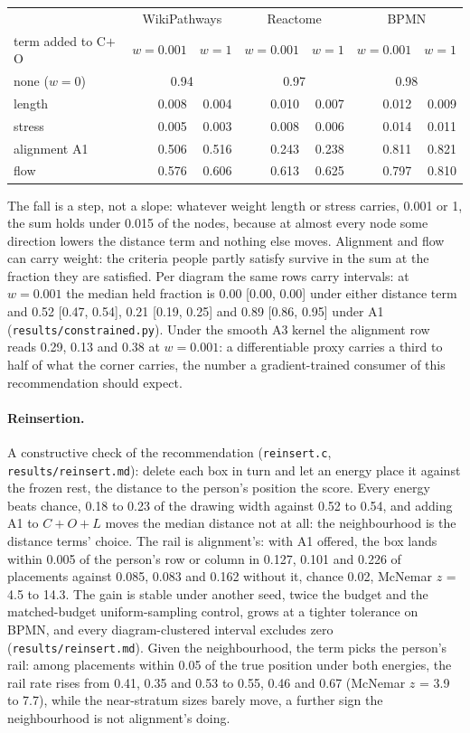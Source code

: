 \documentclass[11pt]{article}
\begin{document}
\begin{center}\small
\begin{tabular}{lrrrrrr}
\toprule
 & \multicolumn{2}{c}{WikiPathways} & \multicolumn{2}{c}{Reactome} & \multicolumn{2}{c}{BPMN} \\
term added to C$+$O & $w{=}0.001$ & $w{=}1$ & $w{=}0.001$ & $w{=}1$ & $w{=}0.001$ & $w{=}1$ \\
\midrule
none ($w = 0$) & \multicolumn{2}{c}{0.94} & \multicolumn{2}{c}{0.97} & \multicolumn{2}{c}{0.98} \\
length & 0.008 & 0.004 & 0.010 & 0.007 & 0.012 & 0.009 \\
stress & 0.005 & 0.003 & 0.008 & 0.006 & 0.014 & 0.011 \\
alignment A1 & 0.506 & 0.516 & 0.243 & 0.238 & 0.811 & 0.821 \\
flow & 0.576 & 0.606 & 0.613 & 0.625 & 0.797 & 0.810 \\
\bottomrule
\end{tabular}
\end{center}

The fall is a step, not a slope: whatever weight length or stress carries, 0.001 or 1, the
sum holds under 0.015 of the nodes, because at almost every node some direction lowers the
distance term and nothing else moves. Alignment and flow can carry weight: the criteria
people partly satisfy survive in the sum at the fraction they are satisfied. Per diagram
the same rows carry intervals: at $w = 0.001$ the median held fraction is 0.00 [0.00,
0.00] under either distance term and 0.52 [0.47, 0.54], 0.21 [0.19, 0.25] and 0.89 [0.86,
0.95] under A1 (\texttt{results/constrained.py}). Under the smooth A3 kernel the
alignment row reads 0.29, 0.13 and 0.38 at $w = 0.001$: a differentiable proxy carries a
third to half of what the corner carries, the number a gradient-trained consumer of this
recommendation should expect.

\paragraph{Reinsertion.} A constructive check of the recommendation
(\texttt{reinsert.c}, \texttt{results/reinsert.md}): delete each box in turn and let an
energy place it against the frozen rest, the distance to the person's position the
score. Every energy beats chance, 0.18 to 0.23 of the drawing width against 0.52 to
0.54, and adding A1 to $C{+}O{+}L$ moves the median distance not at all: the
neighbourhood is the distance terms' choice. The rail is alignment's: with A1 offered,
the box lands within 0.005 of the person's row or column in 0.127, 0.101 and 0.226 of
placements against 0.085, 0.083 and 0.162 without it, chance 0.02, McNemar $z$ = 4.5 to
14.3. The gain is stable under another seed, twice the budget and the matched-budget
uniform-sampling control, grows at a tighter tolerance on BPMN, and every
diagram-clustered interval excludes zero (\texttt{results/reinsert.md}). Given the neighbourhood, the term picks the person's rail: among placements
within 0.05 of the true position under both energies, the rail rate rises from 0.41,
0.35 and 0.53 to 0.55, 0.46 and 0.67 (McNemar $z$ = 3.9 to 7.7), while the
near-stratum sizes barely move, a further sign the neighbourhood is not alignment's
doing.
\end{document}
